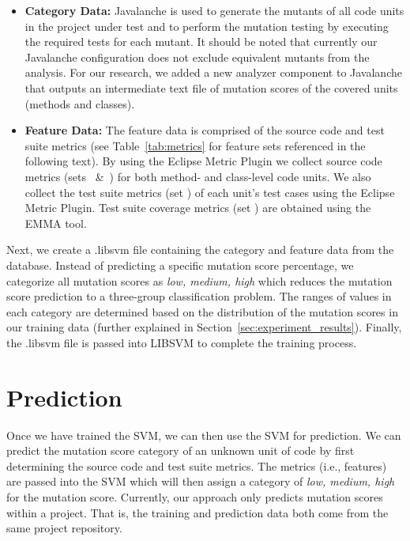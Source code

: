 \begin{itemize}
  \item \textbf{Category Data:} Javalanche is used to generate the mutants of all code units in the project under test and to perform the mutation testing by executing the required tests for each mutant. It should be noted that currently our Javalanche configuration does not exclude equivalent mutants from the analysis. For our research, we added a new analyzer component to Javalanche that outputs an intermediate text file of mutation scores of the covered units (methods and classes).

  \item \textbf{Feature Data:} The feature data is comprised of the source code and test suite metrics (see Table~\ref{tab:metrics} for feature sets referenced in the following text). By using the Eclipse Metric Plugin we collect source code metrics (sets ~\&~) for both method- and class-level code units. We also collect the test suite metrics (set ) of each unit's test cases using the Eclipse Metric Plugin. Test suite coverage metrics (set ) are obtained using the EMMA tool.
\end{itemize}

Next, we create a .libsvm file containing the category and feature data from the database. Instead of predicting a specific mutation score percentage, we categorize all mutation scores as \textit{low, medium, high} which reduces the mutation score prediction to a three-group classification problem. The ranges of values in each category are determined based on the distribution of the mutation scores in our training data (further explained in Section~\ref{sec:experiment_results}). Finally, the .libsvm file is passed into LIBSVM to complete the training process.


\section{Prediction}
\label{sec:approach_prediction}
Once we have trained the SVM, we can then use the SVM for prediction. We can predict the mutation score category of an unknown unit of code by first determining the source code and test suite metrics. The metrics (i.e., features) are passed into the SVM which will then assign a category of \textit{low, medium, high} for the mutation score.  Currently, our approach only predicts mutation scores within a project. That is, the training and prediction data both come from the same project repository.


